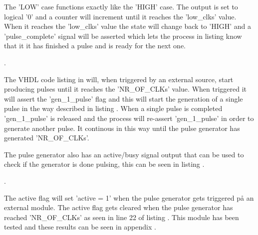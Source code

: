 The 'LOW' case functions exactly like the 'HIGH' case. The output is set to logical '0' and a counter will increment until it reaches the 'low\_clks' value. When it reaches the 'low\_clks' value the state will change back to 'HIGH' and a 'pulse\_complete' signal will be asserted which lets the process in listing  know that it it has finished a pulse and is ready for the next one.

. 

The VHDL code listing in  will, when triggered by an external source, start producing pulses until it reaches the 'NR\_OF\_CLKs' value. When triggered it will assert the 'gen\_1\_pulse' flag and this will start the generation of a single pulse in the way described in listing . When a single pulse is completed 'gen\_1\_pulse' is released and the process will re-assert 'gen\_1\_pulse' in order to generate another pulse. It continous in this way until the pulse generator has generated 'NR\_OF\_CLKs'.

The pulse generator also has an active/busy signal output that can be used to check if the generator is done pulsing, this can be seen in listing .

. 

The active flag will set 'active = 1' when the pulse generator gets triggered på an external module. The active flag gets cleared when the pulse generator has reached 'NR\_OF\_CLKs' as seen in line 22 of listing . This module has been tested and these results can be seen in appendix .






